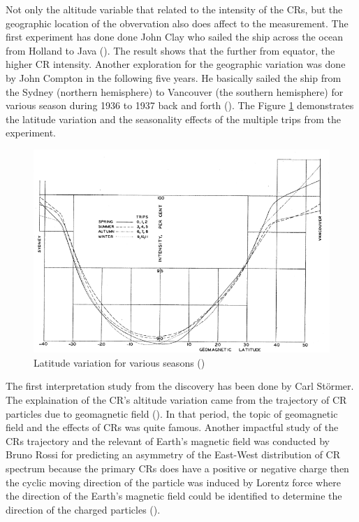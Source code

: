 Not only the altitude variable that related to the 
intensity of the CRs, but the geographic location of the 
obvervation also does affect to the measurement.
The first experiment has done done John Clay who
sailed the ship across the ocean from Holland to Java
(\cite{Clay1927,Clay1928}). The result shows that
the further from equator, the higher CR intensity.
Another exploration for the geographic variation was 
done by John Compton in the following five years.
He basically sailed the ship from the Sydney (northern hemisphere)
to Vancouver (the southern hemisphere) for various season
during 1936 to 1937 back and forth (\cite{compton1937cosmic}).
The Figure \ref{fig:comptonship} demonstrates the 
latitude variation and the seasonality effects of the 
multiple trips from the experiment.

\begin{figure}[h!]
    \centering
    \includegraphics[width=\textwidth]{content/background/figures/compton_sail_1937.png}
    \caption{Latitude variation for various seasons (\cite{compton1937cosmic})}
    \label{fig:comptonship}
\end{figure}
	
The first interpretation study from the discovery has been
done by Carl Störmer. The explaination of the CR's altitude variation
came from the trajectory of CR particles due to geomagnetic field
(\cite{stormer1934critical}). In that period, the topic of 
geomagnetic field and the effects of CRs was quite famous.
Another impactful study of the CRs trajectory and the relevant
of Earth's magnetic field was conducted by Bruno Rossi
for predicting an asymmetry of the East-West distribution
of CR spectrum because the primary CRs does have a positive or
negative charge then the cyclic moving direction of the 
particle was induced by Lorentz force where the direction of 
the Earth's magnetic field could be identified to determine the
direction of the charged particles (\cite{rossi1941cosmic}).

